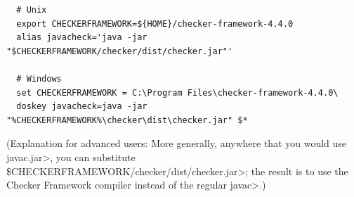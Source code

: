\begin{itemize}
\begin{Verbatim}
  # Unix
  export CHECKERFRAMEWORK=${HOME}/checker-framework-4.4.0
  alias javacheck='java -jar "$CHECKERFRAMEWORK/checker/dist/checker.jar"'

  # Windows
  set CHECKERFRAMEWORK = C:\Program Files\checker-framework-4.4.0\
  doskey javacheck=java -jar "%CHECKERFRAMEWORK%\checker\dist\checker.jar" $*
\end{Verbatim}

  (Explanation for advanced users:
  More generally, anywhere that you would use \<javac.jar>, you can substitute
  \<\$CHECKERFRAMEWORK/checker/dist/checker.jar>;
  the result is to use the Checker
  Framework compiler instead of the regular \<javac>.)

\end{itemize}



%
%
%
%
%
%
%
%


